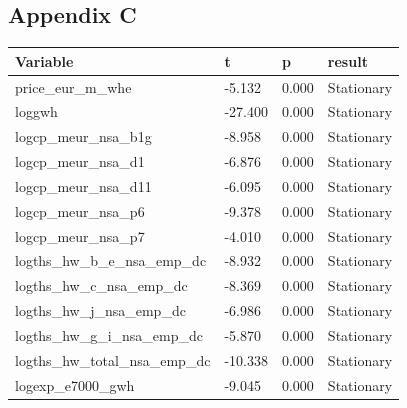 \documentclass[12pt]{article}
\begin{document}
\newpage
\subsection{Appendix C}
\begin{tabular}{ p{6.2cm} p{2cm} p{2cm} p{2cm} }

  \hline
Variable&t&p&result\\
 \hline
 price\_eur\_m\_whe&-5.132&0.000&Stationary\\
 loggwh&-27.400&0.000&Stationary\\
logcp\_meur\_nsa\_b1g&-8.958&0.000&Stationary\\
logcp\_meur\_nsa\_d1&-6.876&0.000&Stationary\\
logcp\_meur\_nsa\_d11&-6.095&0.000&Stationary\\
logcp\_meur\_nsa\_p6&-9.378&0.000&Stationary\\
logcp\_meur\_nsa\_p7&-4.010&0.000&Stationary\\
logths\_hw\_b\_e\_nsa\_emp\_dc&-8.932&0.000&Stationary\\
logths\_hw\_c\_nsa\_emp\_dc&-8.369&0.000&Stationary\\
logths\_hw\_j\_nsa\_emp\_dc&-6.986&0.000&Stationary\\
logths\_hw\_g\_i\_nsa\_emp\_dc&-5.870&0.000&Stationary\\
logths\_hw\_total\_nsa\_emp\_dc&-10.338&0.000&Stationary\\
logexp\_e7000\_gwh&-9.045&0.000&Stationary\\
 \hline
\end{tabular}
\end{document}
